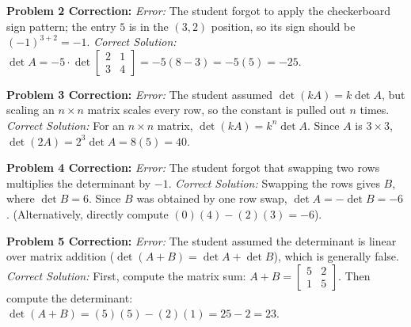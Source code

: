 \documentclass{article}
\begin{document}
\textbf{Problem 2 Correction:}
\textit{Error:} The student forgot to apply the checkerboard sign pattern; the entry $5$ is in the $(3,2)$ position, so its sign should be $(-1)^{3+2} = -1$.
\textit{Correct Solution:} $\det A = -5 \cdot \det \begin{bmatrix} 2 & 1 \\ 3 & 4 \end{bmatrix} = -5(8 - 3) = -5(5) = -25$.

\textbf{Problem 3 Correction:}
\textit{Error:} The student assumed $\det(kA) = k \det A$, but scaling an $n \times n$ matrix scales every row, so the constant is pulled out $n$ times.
\textit{Correct Solution:} For an $n \times n$ matrix, $\det(kA) = k^n \det A$. Since $A$ is $3 \times 3$, $\det(2A) = 2^3 \det A = 8(5) = 40$.

\textbf{Problem 4 Correction:}
\textit{Error:} The student forgot that swapping two rows multiplies the determinant by $-1$.
\textit{Correct Solution:} Swapping the rows gives $B$, where $\det B = 6$. Since $B$ was obtained by one row swap, $\det A = -\det B = -6$. (Alternatively, directly compute $(0)(4) - (2)(3) = -6$).

\textbf{Problem 5 Correction:}
\textit{Error:} The student assumed the determinant is linear over matrix addition ($\det(A+B) = \det A + \det B$), which is generally false.
\textit{Correct Solution:} First, compute the matrix sum: $A + B = \begin{bmatrix} 5 & 2 \\ 1 & 5 \end{bmatrix}$. Then compute the determinant: $\det(A+B) = (5)(5) - (2)(1) = 25 - 2 = 23$.
\end{document}
